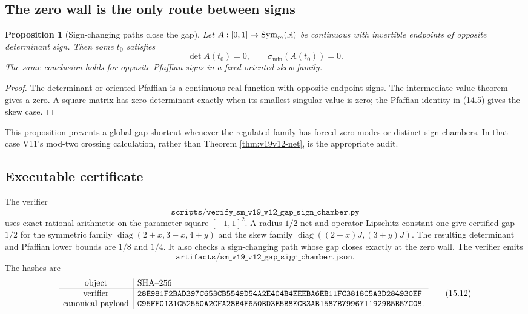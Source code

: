 \documentclass[11pt]{article}
\newtheorem{proposition}[theorem]{Proposition}
\theoremstyle{remark}
\begin{document}
\subsection{The zero wall is the only route between signs}

\begin{proposition}[Sign-changing paths close the gap]
\label{prop:v19v12-zero-wall}
Let \(A:[0,1]\to{\rm Sym}_m(\mathbb R)\) be continuous with invertible
endpoints of opposite determinant sign.  Then some \(t_0\) satisfies
\[
 \det A(t_0)=0,\qquad \sigma_{\min}(A(t_0))=0.                 \tag{15.9}
\]
The same conclusion holds for opposite Pfaffian signs in a fixed oriented
skew family.
\end{proposition}

\begin{proof}
The determinant or oriented Pfaffian is a continuous real function with
opposite endpoint signs.  The intermediate value theorem gives a zero.
A square matrix has zero determinant exactly when its smallest singular
value is zero; the Pfaffian identity in (14.5) gives the skew case.
\end{proof}

This proposition prevents a global-gap shortcut whenever the regulated family has
forced zero modes or distinct sign chambers.  In that case V11's
mod-two crossing calculation, rather than Theorem \ref{thm:v19v12-net},
is the appropriate audit.

\subsection{Executable certificate}

The verifier
\[
 \texttt{scripts/verify\_sm\_v19\_v12\_gap\_sign\_chamber.py}  \tag{15.10}
\]
uses exact rational arithmetic on the parameter square
\([-1,1]^2\).  A radius-\(1/2\) net and operator-Lipschitz constant one
give certified gap \(1/2\) for the symmetric family
\(\operatorname{diag}(2+x,3-x,4+y)\) and the skew family
\(\operatorname{diag}((2+x)J,(3+y)J)\).  The resulting determinant and Pfaffian
lower bounds are \(1/8\) and \(1/4\).  It also checks a sign-changing path whose gap
closes exactly at the zero wall.  The verifier emits
\[
 \texttt{artifacts/sm\_v19\_v12\_gap\_sign\_chamber.json}.     \tag{15.11}
\]
The hashes are
\[
\begin{array}{c|l}
\hbox{object}&\hbox{SHA--256}\\ \hline
\hbox{verifier}&
\texttt{28E981F2BAD397C653CB5549D54A2E404B4EEEBA6EB11FC3818C5A3D284930EF}\\
\hbox{canonical payload}&
\texttt{C95FF0131C52550A2CFA28B4F650BD3E5B8ECB3AB1587B7996711929B5B57C08}.
\end{array}                                                     \tag{15.12}
\]
\end{document}
